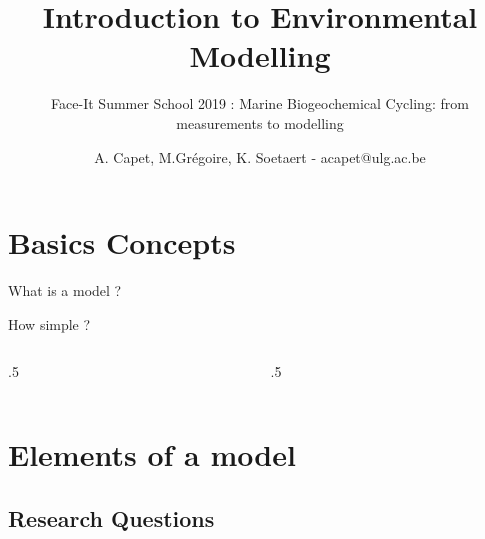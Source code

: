 \documentclass[final,xcolor=dvipsnames]{beamer}
\title[Introduction to Environmental Modelling]{Introduction to Environmental Modelling}
\subtitle{Face-It Summer School 2019 : Marine Biogeochemical Cycling: from measurements to modelling}
\author[A. Capet]{A. Capet, M.Grégoire, K. Soetaert - acapet@ulg.ac.be} %
\institute[http://labos.ulg.ac.be/mast/]{MAST}
\date[Oct 2019]
\begin{document}

\begin{frame}
  \titlepage
\end{frame}


\section{Basics Concepts}
\begin{frame}{What is a model ?}
\end{frame}

\begin{frame}{How simple ?}
\begin{columns}
\begin{column}{.5\framewidth}
\end{column}
\begin{column}{.5\framewidth}
\end{column}
\end{columns}
\end{frame}


\section{Elements of a model}
\subsection{Research Questions}
\end{document}

